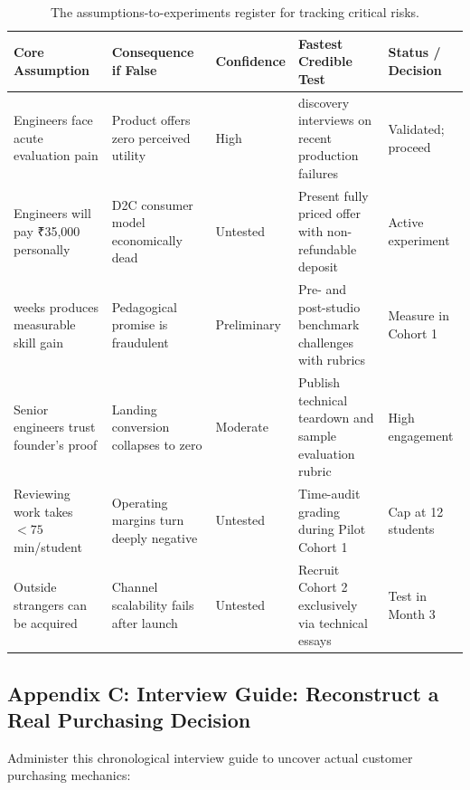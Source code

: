 \begin{table}[t]
\centering
\small
\begin{tabularx}{\textwidth}{>{\raggedright\arraybackslash}p{3.2cm} >{\raggedright\arraybackslash}p{3.5cm} >{\raggedright\arraybackslash}p{2.2cm} >{\raggedright\arraybackslash}X >{\raggedright\arraybackslash}p{2.5cm}}
\toprule
\textbf{Core Assumption} & \textbf{Consequence if False} & \textbf{Confidence} & \textbf{Fastest Credible Test} & \textbf{Status / Decision} \\
\midrule
Engineers face acute evaluation pain & Product offers zero perceived utility & High & 15 discovery interviews on recent production failures & Validated; proceed \\
Engineers will pay ₹35,000 personally & D2C consumer model economically dead & Untested & Present fully priced offer with non-refundable deposit & Active experiment \\
3 weeks produces measurable skill gain & Pedagogical promise is fraudulent & Preliminary & Pre- and post-studio benchmark challenges with rubrics & Measure in Cohort 1 \\
Senior engineers trust founder's proof & Landing conversion collapses to zero & Moderate & Publish technical teardown and sample evaluation rubric & High engagement \\
Reviewing work takes $< 75$ min/student & Operating margins turn deeply negative & Untested & Time-audit grading during Pilot Cohort 1 & Cap at 12 students \\
Outside strangers can be acquired & Channel scalability fails after launch & Untested & Recruit Cohort 2 exclusively via technical essays & Test in Month 3 \\
\bottomrule
\end{tabularx}
\caption{The assumptions-to-experiments register for tracking critical risks.}
\label{tab:ch9-app-assumptions}
\end{table}

\subsection*{Appendix C: Interview Guide: Reconstruct a Real Purchasing Decision}

Administer this chronological interview guide to uncover actual customer purchasing mechanics:

